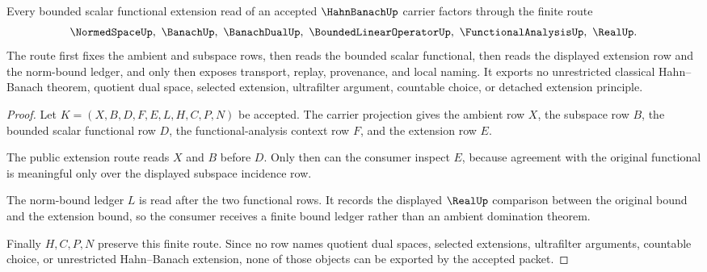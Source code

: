 \begin{theorem}
\label{thm:hahn-banach-bounded-functional-extension-route}
Every bounded scalar functional extension read of an accepted $\HahnBanachUp$ carrier factors through the finite route
$$
\NormedSpaceUp,\ \BanachUp,\ \BanachDualUp,\ \BoundedLinearOperatorUp,\ \FunctionalAnalysisUp,\ \RealUp .
$$
The route first fixes the ambient and subspace rows, then reads the bounded scalar functional, then reads the displayed extension row and the norm-bound ledger, and only then exposes transport, replay, provenance, and local naming. It exports no unrestricted classical Hahn--Banach theorem, quotient dual space, selected extension, ultrafilter argument, countable choice, or detached extension principle.
\end{theorem}
\begin{proof}
Let $K=(X,B,D,F,E,L,H,C,P,N)$ be accepted. The carrier projection gives the ambient row $X$, the subspace row $B$, the bounded scalar functional row $D$, the functional-analysis context row $F$, and the extension row $E$.

The public extension route reads $X$ and $B$ before $D$. Only then can the consumer inspect $E$, because agreement with the original functional is meaningful only over the displayed subspace incidence row.

The norm-bound ledger $L$ is read after the two functional rows. It records the displayed $\RealUp$ comparison between the original bound and the extension bound, so the consumer receives a finite bound ledger rather than an ambient domination theorem.

Finally $H,C,P,N$ preserve this finite route. Since no row names quotient dual spaces, selected extensions, ultrafilter arguments, countable choice, or unrestricted Hahn--Banach extension, none of those objects can be exported by the accepted packet.
\end{proof}




